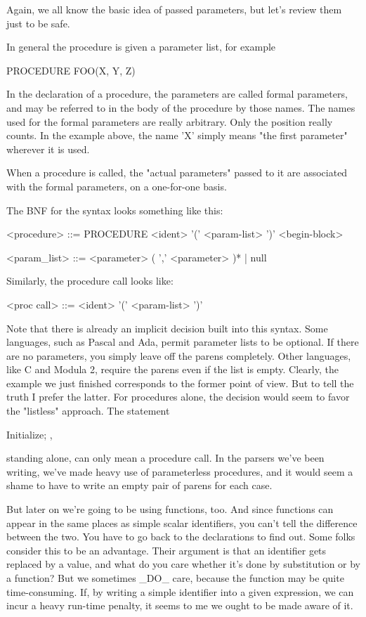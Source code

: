 \documentclass[float=false, crop=false]{standalone}
\begin{document}
Again, we all know the basic idea of passed parameters, but let's review them
just to be safe.

In general the procedure is given a parameter list, for example

     PROCEDURE FOO(X, Y, Z)

In the declaration of a procedure, the parameters are called formal parameters,
and may be referred to in the body of the procedure by those names. The names
used for the formal parameters are really arbitrary. Only the position really
counts. In the example above, the name 'X' simply means "the first parameter"
wherever it is used.

When a procedure is called, the "actual parameters" passed to it are associated
with the formal parameters, on a one-for-one basis.

The BNF for the syntax looks something like this:


     <procedure> ::= PROCEDURE <ident>
                    '(' <param-list> ')' <begin-block>


     <param_list> ::= <parameter> ( ',' <parameter> )* | null

Similarly, the procedure call looks like:


     <proc call> ::= <ident> '(' <param-list> ')'


Note that there is already an implicit decision built into this syntax. Some
languages, such as Pascal and Ada, permit parameter lists to be optional. If
there are no parameters, you simply leave off the parens completely. Other
languages, like C and Modula 2, require the parens even if the list is empty.
Clearly, the example we just finished corresponds to the former point of view.
But to tell the truth I prefer the latter. For procedures alone, the decision
would seem to favor the "listless" approach. The statement


     Initialize; ,


standing alone, can only mean a procedure call. In the parsers we've been
writing, we've made heavy use of parameterless procedures, and it would seem a
shame to have to write an empty pair of parens for each case.

But later on we're going to be using functions, too. And since functions can
appear in the same places as simple scalar identifiers, you can't tell the
difference between the two. You have to go back to the declarations to find out.
Some folks consider this to be an advantage. Their argument is that an
identifier gets replaced by a value, and what do you care whether it's done by
substitution or by a function? But we sometimes _DO_ care, because the function
may be quite time-consuming. If, by writing a simple identifier into a given
expression, we can incur a heavy run-time penalty, it seems to me we ought to be
made aware of it.
\end{document}
